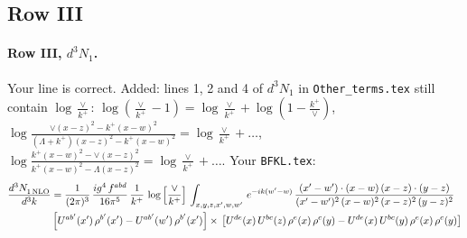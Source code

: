 \documentclass[10pt]{article}
\numberwithin{equation}{section}
\newcommand{\new}[1]{{\color{blue}#1}}
\begin{document}
\subsection{Row III}
\paragraph{Row III, $d^3N_1$.}
Your line is correct. \new{Added}: lines 1, 2 and 4 of $d^3N_1$ in \texttt{Other\_terms.tex} still contain $\log\frac{\vee}{k^+}$: $\log(\frac{\vee}{k^+}-1)=\log\frac{\vee}{k^+}+\log(1-\frac{k^+}{\vee})$, $\log\frac{\vee(x-z)^2-k^+(x-w)^2}{(\Lambda+k^+)(x-z)^2-k^+(x-w)^2}=\log\frac{\vee}{k^+}+\dots$, $\log\frac{k^+(x-w)^2-\vee(x-z)^2}{k^+(x-w)^2-\Lambda(x-z)^2}=\log\frac{\vee}{k^+}+\dots$.
\noindent Your \texttt{BFKL.tex}:
\begin{align}
   \frac{d^{3}N_{1\,\rm NLO}^{\rm}}{d^{3}k}  & =  \frac{1}{(2\pi)^{3}}\,\frac{ig^{4}\,f^{abd}}{16\pi^{5}}\,\frac{1}{k^{+}}\,\log{\left[\frac{\vee}{k^{+}}\right]}\,\int_{x,y,z,x',w,w'}\, e^{-ik(w^\prime-w)}\, \frac{(x'-w')\cdot (x-w)\, (x-z)\cdot (y-z)}{(x'-w')^{2}\, (x-w)^{2}\, (x-z)^{2}\, (y-z)^{2}}\, \notag \\ & \left[U^{ab'}(x')\,\rho^{b'}(x')-U^{ab'}(w')\, \rho^{b'}(x')\right]\times\, \left[U^{de}(x)\,U^{bc}(z)\, \rho^{e}(x)\,\rho^{c}(y)-U^{de}(x)\,U^{bc}(y)\,\rho^{e}(x)\,\rho^{c}(y)\right] \label{eq:Byour:G1IIIN1}
\end{align}
\end{document}
